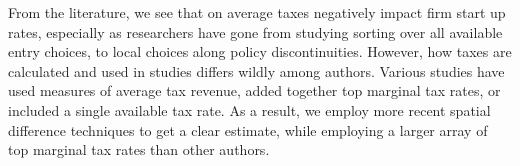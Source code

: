 From the literature, we see that on average taxes negatively impact firm start up rates, especially as researchers have gone from studying sorting over all available entry choices, to local choices along policy discontinuities. However, how taxes are calculated and used in studies differs wildly among authors. Various studies have used measures of average tax revenue, added together top marginal tax rates, or included a single available tax rate. As a result, we employ more recent spatial difference techniques to get a clear estimate, while employing a larger array of top marginal tax rates than other authors.